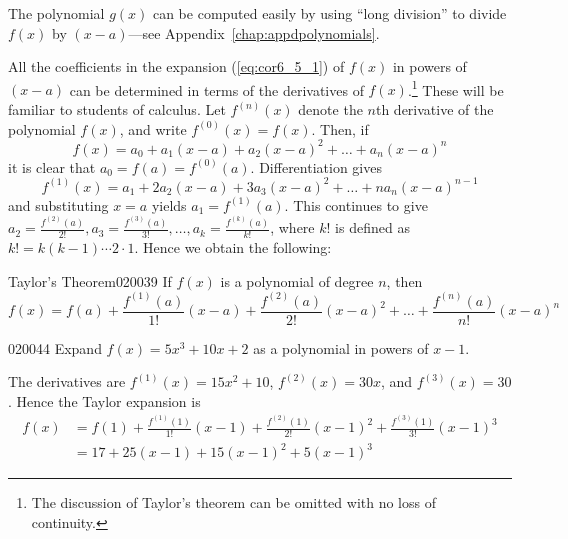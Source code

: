 \noindent The polynomial $g(x)$ can be computed easily by using ``long division'' to divide $f(x)$ by $(x - a)$---see Appendix~\ref{chap:appdpolynomials}.


All the coefficients in the expansion (\ref{eq:cor6_5_1}) of $f(x)$ in powers of $(x - a)$ can be determined in terms of the derivatives of $f(x)$.\footnote{The discussion of Taylor's theorem can be omitted with no loss of continuity.}
 These will be familiar to students of calculus. Let $f^{(n)}(x)$ denote the $n$th derivative of the polynomial $f(x)$, and write $f^{(0)}(x) = f(x)$. Then, if
\begin{equation*}
f(x) = a_0 + a_1(x - a) + a_2(x - a)^2 + \dots + a_n(x - a)^n
\end{equation*}
it is clear that $a_{0} = f(a) = f^{(0)}(a)$. Differentiation gives
\begin{equation*}
f^{(1)}(x) = a_1 + 2a_2(x - a) + 3a_3(x - a)^2 + \dots + na_n(x - a)^{n - 1}
\end{equation*}
and substituting $x = a$ yields $a_{1} = f^{(1)}(a)$. This continues to give 
$a_2 = \frac{f^{(2)}(a)}{2!}, a_3 = \frac{f^{(3)}(a)}{3!}, \dots, a_k = \frac{f^{(k)}(a)}{k!}$, where $k!$ is defined as $k! = k(k - 1) \cdots 2 \cdot 1$. Hence we obtain the following:

\begin{corollary}{Taylor's Theorem}{020039}
If $f(x)$ is a polynomial of degree $n$, then
\begin{equation*}
f(x) = f(a) + \frac{f^{(1)}(a)}{1!}(x - a) + \frac{f^{(2)}(a)}{2!}(x - a)^2 + \dots + \frac{f^{(n)}(a)}{n!}(x - a)^n
\end{equation*}
\end{corollary}

\begin{example}{}{020044}
Expand $f(x) = 5x^{3} + 10x + 2$ as a polynomial in powers of $x - 1$.

\begin{solution}
The derivatives are $f^{(1)}(x) = 15x^{2} + 10$, $f^{(2)}(x) = 30x$, and $f^{(3)}(x) = 30$. Hence the Taylor expansion is
\begin{align*}
f(x) &= f(1) + \frac{f^{(1)}(1)}{1!}(x - 1) + \frac{f^{(2)}(1)}{2!}(x - 1)^2 + \frac{f^{(3)}(1)}{3!}(x - 1)^3 \\
&= 17 + 25(x - 1) + 15(x - 1)^2 +5(x - 1)^3
\end{align*}
\end{solution}
\end{example}

